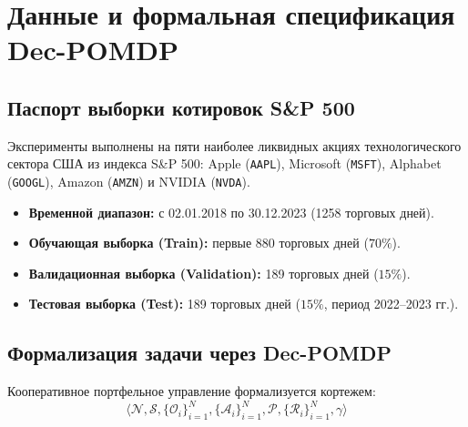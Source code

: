 \documentclass[11pt,a4paper]{article}
\begin{document}
\section{Данные и формальная спецификация Dec-POMDP}

\subsection{Паспорт выборки котировок S\&P 500}

Эксперименты выполнены на пяти наиболее ликвидных акциях технологического сектора США из индекса S\&P 500: Apple (\texttt{AAPL}), Microsoft (\texttt{MSFT}), Alphabet (\texttt{GOOGL}), Amazon (\texttt{AMZN}) и NVIDIA (\texttt{NVDA}).
\begin{itemize}[leftmargin=*]
\item \textbf{Временной диапазон:} с 02.01.2018 по 30.12.2023 (1258 торговых дней).
\item \textbf{Обучающая выборка (Train):} первые 880 торговых дней ($70\%$).
\item \textbf{Валидационная выборка (Validation):} 189 торговых дней ($15\%$).
\item \textbf{Тестовая выборка (Test):} 189 торговых дней ($15\%$, период 2022--2023 гг.).
\end{itemize}

\subsection{Формализация задачи через Dec-POMDP}

Кооперативное портфельное управление формализуется кортежем:
$$\langle \mathcal{N}, \mathcal{S}, \{\mathcal{O}_i\}_{i=1}^N, \{\mathcal{A}_i\}_{i=1}^N, \mathcal{P}, \{\mathcal{R}_i\}_{i=1}^N, \gamma \rangle$$
\end{document}
